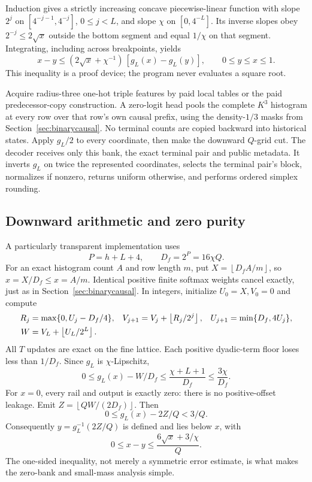 \documentclass[11pt,letterpaper]{article}
\theoremstyle{definition}\newtheorem{definition}[theorem]{Definition}
\theoremstyle{remark}\newtheorem{remark}[theorem]{Remark}
\newcommand{\floor}[1]{\left\lfloor #1\right\rfloor}
\begin{document}
Induction gives a strictly increasing concave piecewise-linear function with slope $2^j$ on $[4^{-j-1},4^{-j}]$, $0\le j<L$, and slope $\chi$ on $[0,4^{-L}]$. Its inverse slopes obey $2^{-j}\le2\sqrt x$ outside the bottom segment and equal $1/\chi$ on that segment. Integrating, including across breakpoints, yields
\begin{equation}\label{eq:companderinverse}
 x-y\le(2\sqrt x+\chi^{-1})\,[g_L(x)-g_L(y)],
 \qquad 0\le y\le x\le1.
\end{equation}
This inequality is a proof device; the program never evaluates a square root.

Acquire radius-three one-hot triple features by paid local tables or the paid predecessor-copy construction. A zero-logit head pools the complete $K^3$ histogram at every row over that row's own causal prefix, using the density-$1/3$ masks from Section~\ref{sec:binarycausal}. No terminal counts are copied backward into historical states. Apply $g_L/2$ to every coordinate, then make the downward $Q$-grid cut. The decoder receives only this bank, the exact terminal pair and public metadata. It inverts $g_L$ on twice the represented coordinates, selects the terminal pair's block, normalizes if nonzero, returns uniform otherwise, and performs ordered simplex rounding.

\subsection{Downward arithmetic and zero purity}
A particularly transparent implementation uses
\[
 P=h+L+4,\qquad D_f=2^P=16\chi Q.
\]
For an exact histogram count $A$ and row length $m$, put
$X=\floor{D_fA/m}$, so $\widehat x=X/D_f\le x=A/m$.
Identical positive finite softmax weights cancel exactly, just as in Section~\ref{sec:binarycausal}. In integers, initialize $U_0=X,V_0=0$ and compute
\begin{align}\label{eq:downrails}
 R_j&=\max\{0,U_j-D_f/4\},&
 V_{j+1}&=V_j+\floor{R_j/2^j},&
 U_{j+1}&=\min\{D_f,4U_j\},\\
 W&=V_L+\floor{U_L/2^L}.&&&&\notag
\end{align}
All $T$ updates are exact on the fine lattice. Each positive dyadic-term floor loses less than $1/D_f$. Since $g_L$ is $\chi$-Lipschitz,
\begin{equation}\label{eq:downerror}
 0\le g_L(x)-W/D_f
 \le\frac{\chi+L+1}{D_f}\le\frac{3\chi}{D_f}.
\end{equation}
For $x=0$, every rail and output is exactly zero: there is no positive-offset leakage. Emit $Z=\floor{QW/(2D_f)}$. Then
\[
 0\le g_L(x)-2Z/Q<3/Q.
\]
Consequently $y=g_L^{-1}(2Z/Q)$ is defined and lies below $x$, with
\begin{equation}\label{eq:inverseerror}
 0\le x-y\le\frac{6\sqrt x+3/\chi}{Q}.
\end{equation}
The one-sided inequality, not merely a symmetric error estimate, is what makes the zero-bank and small-mass analysis simple.
\end{document}
